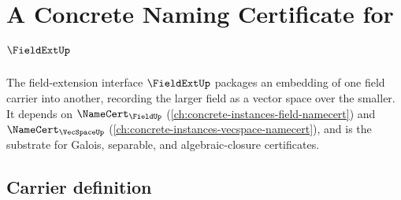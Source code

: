 \chapter{A Concrete Naming Certificate for $\FieldExtUp$}
\label{ch:concrete-instances-fieldext-namecert}

The field-extension interface $\FieldExtUp$ packages an embedding of one field carrier into another, recording the larger field as a vector space over the smaller. It depends on $\NameCert_{\FieldUp}$ (\autoref{ch:concrete-instances-field-namecert}) and $\NameCert_{\VecSpaceUp}$ (\autoref{ch:concrete-instances-vecspace-namecert}), and is the substrate for Galois, separable, and algebraic-closure certificates.

\section{Carrier definition}
\label{sec:fieldext-carrier}

